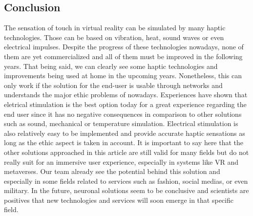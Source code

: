 \documentclass[12pt, a4paper]{article}
\begin{document}
\begin{multicols}{2}
\section{Conclusion}
The sensation of touch in virtual reality can be simulated by many haptic technologies. Those can be based on vibration, heat, sound waves or even electrical impulses. Despite the progress of these technologies nowadays, none of them are yet commercialized and all of them must be improved in the following years. That being said, we can clearly see some haptic technologies and improvements being used at home in the upcoming years. Nonetheless, this can only work if the solution for the end-user is usable through networks and understands the major ethic problems of nowadays. 
\newline Experiences have shown that eletrical stimulation is the best option today for a great experience regarding the end user since it has no negative consequences in comparison to other solutions such as sound, mechanical or temperature simulation. Electrical stimulation is also relatively easy to be implemented and provide accurate haptic sensations as long as the ethic aspect is taken in account. It is important to say here that the other solutions approached in this article are still valid for many fields but do not really suit for an immersive user experience, especially in systems like VR and metaverses.
Our team already see the potential behind this solution and especially in some fields related to services such as fashion, social medias, or even military. In the future, neuronal solutions seem to be conclusive and scientists are positives that new technologies and services will soon emerge in that specific field.

\printbibliography
\end{multicols}
\end{document}
